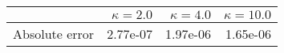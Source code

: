 \begin{tabular}{lrrr}
\toprule
 & $\kappa = 2.0$ & $\kappa = 4.0$ & $\kappa = 10.0$ \\
\midrule
Absolute error & 2.77e-07 & 1.97e-06 & 1.65e-06 \\
\bottomrule
\end{tabular}
